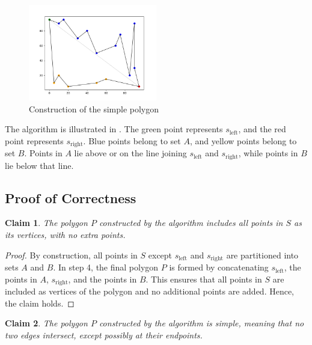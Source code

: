 \documentclass[12pt]{article}
\newtheorem{claim}{Claim}
\begin{document}
\begin{figure}[H]
    \centering
    \includegraphics[width=0.5\textwidth]{img/polygon.png}
    \caption{Construction of the simple polygon}\label{fig:polygon}
\end{figure}

The algorithm is illustrated in . The green point represents \(s_{\text{left}}\), and the red point represents \(s_{\text{right}}\). Blue points belong to set \(A\), and yellow points belong to set \(B\). Points in \(A\) lie above or on the line joining \(s_{\text{left}}\) and \(s_{\text{right}}\), while points in \(B\) lie below that line.

\subsection*{Proof of Correctness}

\begin{claim}
    The polygon \(P\) constructed by the algorithm includes all points in \(S\) as its vertices, with no extra points.
    \label{claim1}
\end{claim}

\begin{proof}
    By construction, all points in \(S\) except \(s_{\text{left}}\) and \(s_{\text{right}}\) are partitioned into sets \(A\) and \(B\). In step 4, the final polygon \(P\) is formed by concatenating \(s_{\text{left}}\), the points in \(A\), \(s_{\text{right}}\), and the points in \(B\). This ensures that all points in \(S\) are included as vertices of the polygon and no additional points are added. Hence, the claim holds.
\end{proof}

\begin{claim}
    The polygon \(P\) constructed by the algorithm is simple, meaning that no two edges intersect, except possibly at their endpoints.
    \label{claim2}
\end{claim}
\end{document}
